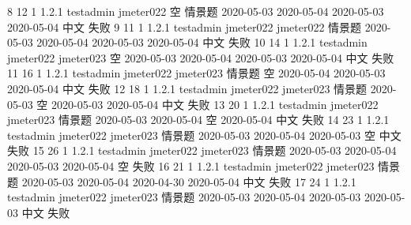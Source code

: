 \documentclass[hyperref, a4paper]{ctexart}
\begin{document}
\textbar{} 8 \textbar{} 12 \textbar{} 1 \textbar{} 1.2.1 \textbar{}
testadmin \textbar{} jmeter022 \textbar{} 空 \textbar{} 情景题
\textbar{} 2020-05-03 \textbar{} 2020-05-04 \textbar{} 2020-05-03
\textbar{} 2020-05-04 \textbar{} 中文 \textbar{} 失败 \textbar{}
\textbar{} 9 \textbar{} 11 \textbar{} 1 \textbar{} 1.2.1 \textbar{}
testadmin \textbar{} jmeter022 \textbar{} jmeter022 \textbar{} 情景题
\textbar{} 2020-05-03 \textbar{} 2020-05-04 \textbar{} 2020-05-03
\textbar{} 2020-05-04 \textbar{} 中文 \textbar{} 失败 \textbar{}
\textbar{} 10 \textbar{} 14 \textbar{} 1 \textbar{} 1.2.1 \textbar{}
testadmin \textbar{} jmeter022 \textbar{} jmeter023 \textbar{} 空
\textbar{} 2020-05-03 \textbar{} 2020-05-04 \textbar{} 2020-05-03
\textbar{} 2020-05-04 \textbar{} 中文 \textbar{} 失败 \textbar{}
\textbar{} 11 \textbar{} 16 \textbar{} 1 \textbar{} 1.2.1 \textbar{}
testadmin \textbar{} jmeter022 \textbar{} jmeter023 \textbar{} 情景题
\textbar{} 空 \textbar{} 2020-05-04 \textbar{} 2020-05-03 \textbar{}
2020-05-04 \textbar{} 中文 \textbar{} 失败 \textbar{} \textbar{} 12
\textbar{} 18 \textbar{} 1 \textbar{} 1.2.1 \textbar{} testadmin
\textbar{} jmeter022 \textbar{} jmeter023 \textbar{} 情景题 \textbar{}
2020-05-03 \textbar{} 空 \textbar{} 2020-05-03 \textbar{} 2020-05-04
\textbar{} 中文 \textbar{} 失败 \textbar{} \textbar{} 13 \textbar{} 20
\textbar{} 1 \textbar{} 1.2.1 \textbar{} testadmin \textbar{} jmeter022
\textbar{} jmeter023 \textbar{} 情景题 \textbar{} 2020-05-03 \textbar{}
2020-05-04 \textbar{} 空 \textbar{} 2020-05-04 \textbar{} 中文
\textbar{} 失败 \textbar{} \textbar{} 14 \textbar{} 23 \textbar{} 1
\textbar{} 1.2.1 \textbar{} testadmin \textbar{} jmeter022 \textbar{}
jmeter023 \textbar{} 情景题 \textbar{} 2020-05-03 \textbar{} 2020-05-04
\textbar{} 2020-05-03 \textbar{} 空 \textbar{} 中文 \textbar{} 失败
\textbar{} \textbar{} 15 \textbar{} 26 \textbar{} 1 \textbar{} 1.2.1
\textbar{} testadmin \textbar{} jmeter022 \textbar{} jmeter023
\textbar{} 情景题 \textbar{} 2020-05-03 \textbar{} 2020-05-04 \textbar{}
2020-05-03 \textbar{} 2020-05-04 \textbar{} 空 \textbar{} 失败
\textbar{} \textbar{} 16 \textbar{} 21 \textbar{} 1 \textbar{} 1.2.1
\textbar{} testadmin \textbar{} jmeter022 \textbar{} jmeter023
\textbar{} 情景题 \textbar{} 2020-05-03 \textbar{} 2020-05-04 \textbar{}
2020-04-30 \textbar{} 2020-05-04 \textbar{} 中文 \textbar{} 失败
\textbar{} \textbar{} 17 \textbar{} 24 \textbar{} 1 \textbar{} 1.2.1
\textbar{} testadmin \textbar{} jmeter022 \textbar{} jmeter023
\textbar{} 情景题 \textbar{} 2020-05-03 \textbar{} 2020-05-04 \textbar{}
2020-05-03 \textbar{} 2020-05-03 \textbar{} 中文 \textbar{} 失败
\textbar{}
\end{document}
